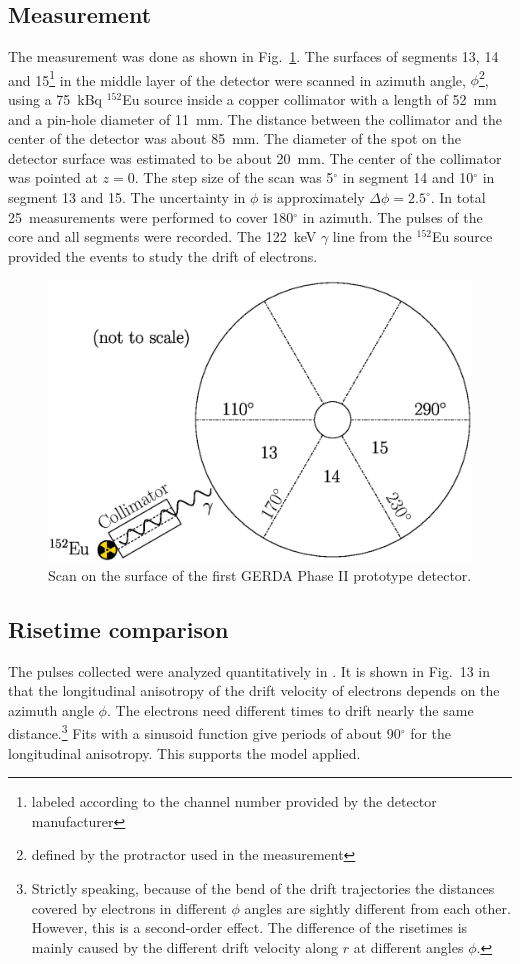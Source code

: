 \documentclass[epj,referee]{svjour}
\begin{document}
\subsection{Measurement}
\label{s:char}
The measurement was done as shown in Fig.~\ref{f:siscan}. The surfaces
of segments 13, 14 and 15\footnote{labeled according to the channel
number provided by the detector manufacturer} in the middle layer of
the detector were scanned in azimuth angle, $\phi$\footnote{defined by
the protractor used in the measurement}, using a 75~kBq $^{152}$Eu
source inside a copper collimator with a length of 52~mm and a
pin-hole diameter of 11~mm. The distance between the collimator and
the center of the detector was about 85~mm. The diameter of the spot
on the detector surface was estimated to be about 20~mm. The center of
the collimator was pointed at $z = 0$. The step size of the scan was
5$^{\circ}$ in segment 14 and 10$^{\circ}$ in segment 13 and 15. The
uncertainty in $\phi$ is approximately $\Delta \phi = 2.5^{\circ}$. In
total 25~measurements were performed to cover 180$^{\circ}$ in
azimuth. The pulses of the core and all segments were recorded. The
122~keV $\gamma$ line from the $^{152}$Eu source provided the events
to study the drift of electrons.

\begin{figure}[htbp]
\centering
\includegraphics[width=0.8\linewidth]{siscan}
\caption{Scan on the surface of the first GERDA Phase II prototype
detector.}
\label{f:siscan}
\end{figure}


\subsection{Risetime comparison}
\label{s:lon}
The pulses collected were analyzed quantitatively in \cite{si}. It is
shown in Fig.~13 in \cite{si} that the longitudinal anisotropy of the
drift velocity of electrons depends on the azimuth angle $\phi$. The
electrons need different times to drift nearly the same
distance.\footnote{Strictly speaking, because of the bend of the drift
trajectories the distances covered by electrons in different $\phi$
angles are sightly different from each other.  However, this is a
second-order effect. The difference of the risetimes is mainly caused
by the different drift velocity along $r$ at different angles $\phi$.}
Fits with a sinusoid function give periods of about 90$^{\circ}$ for
the longitudinal anisotropy. This supports the model applied.
\end{document}
